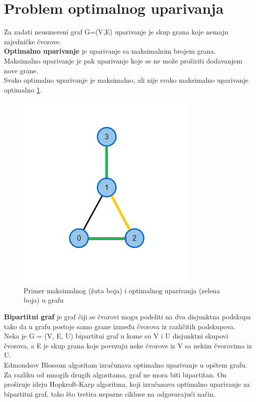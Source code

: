 \documentclass[a4paper]{article}
\theoremstyle{definition}
\begin{document}
\section{Problem optimalnog uparivanja}
Za zadati neusmereni graf G=(V,E) uparivanje je skup grana koje nemaju zajedničke čvorove.\\ \textbf{Optimalno uparivanje} je uparivanje sa maksimalnim brojem grana.\cite{knjiga1}\\ Maksimalno uparivanje je pak uparivanje koje se ne može proširiti dodavanjem nove grane.\\ Svako optimalno uparivanje je maksimalno, ali nije svako maksimalno uparivanje optimalno \ref{fig:slika 1}.
\begin{figure}[H]
\begin{center}
\includegraphics[scale=0.7]{graf1.png}
\end{center}
\caption{Primer maksimalnog (žuta boja) i optimalnog uparivanja (zelena boja) u grafu}
\label{fig:slika 1}
\end{figure}
\textbf{Bipartitni graf} je graf čiji se čvorovi mogu podeliti na dva disjunktna podskupa
tako da u grafu postoje samo grane između čvorova iz različitih podskupova.
Neka je G = (V, E, U) bipartitni graf u kome su V i U disjunktni skupovi čvorova,
a E je skup grana koje povezuju neke čvorove iz V sa nekim čvorovima iz U. \\

Edmondsov Blossom algoritam izračunava optimalno uparivanje u opštem grafu. Za razliku od mnogih drugih algoritama, graf ne mora biti bipartitan. On proširuje ideju Hopkroft-Karp algoritma, koji izračunava optimalno uparivanje za bipartitni graf, tako što tretira neparne cikluse na odgovarajući način.
\end{document}
